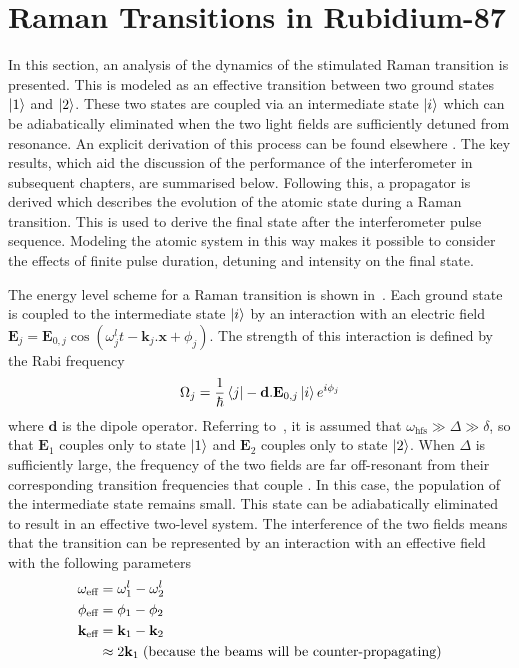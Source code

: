 \section{Raman Transitions in Rubidium-87}\label{sec:theory_raman}
In this section, an analysis of the dynamics of the stimulated Raman transition is
presented. This is modeled as an effective transition between two
ground states $\ket{1}$ and $\ket{2}$. These two states are coupled
via an intermediate state $\ket{i}$ which can be adiabatically
eliminated when the two light fields are sufficiently detuned from
resonance. An explicit derivation of this process can be found
elsewhere
\cite{Weiss1994, Han2012}. The key results, which aid the discussion
of the performance of the interferometer in subsequent chapters, are
summarised below. Following this, a propagator is derived which
describes the evolution of the atomic state during a Raman transition.
This is used to derive the final state after the interferometer pulse
sequence. Modeling the atomic system in this way makes it possible to consider
the effects of finite pulse duration, detuning and intensity
on the final state. 
\par\noindent
The energy level scheme for a Raman transition is shown
in~. Each ground state is coupled to the
intermediate state $\ket{i}$ by an interaction with an electric field  
$ \textbf{E}_j=
\textbf{E}_{0,j} \cos(\omega_j^l t - \textbf{k}_j.\textbf{x}+
\phi_j)$. The strength of this interaction is defined by the Rabi
frequency\begin{equation}
  \label{eq:rabi_freq}
  \Omega_j = \frac{1}{\hbar}\bra{j} -\textbf{d}.\textbf{E}_{0,j}
  \ket{i} e^{i \phi_j}
\end{equation}
where $\textbf{d}$ is the dipole operator. Referring
to~, it is assumed that $\omega_\text{hfs} \gg \Delta \gg \delta$, so
that $\textbf{E}_1$ couples only to state $\ket{1}$ and $\textbf{E}_2$
couples only to state $\ket{2}$. 
When $\Delta$ is sufficiently large, the frequency of the two fields
are far off-resonant from their corresponding transition frequencies
that couple . In this case, the population of the
intermediate state remains small. This state can be adiabatically
eliminated to result in an effective two-level system. The
interference of the two fields means that the transition can be
represented by an interaction with an effective field with the
following parameters
\begin{subequations}
  \begin{align}
    \omega_\textnormal{eff} &= \omega^l_1 - \omega^l_2 \\
    \phi_\textnormal{eff} &= \phi_1 -\phi_2 \\
    {\textbf k_\textnormal{eff}} &= \textbf{k}_1 - \textbf{k}_2 \\
          &\approx 2\textbf{k}_1\;
    \text{(because the beams will be counter-propagating)} \nonumber 
  \end{align}
\end{subequations}
